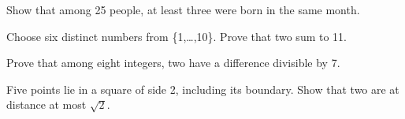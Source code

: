 \documentclass[11pt]{article}
\begin{document}
Show that among 25 people, at least three were born in the same month.\par
\vspace{5pt}
Choose six distinct numbers from \{1,…,10\}. Prove that two sum to 11.\par
\vspace{5pt}
Prove that among eight integers, two have a difference divisible by 7.\par
\vspace{5pt}
Five points lie in a square of side 2, including its boundary. Show that two are at distance at most \(\sqrt{2}\).\par
\vspace{5pt}
\end{document}
